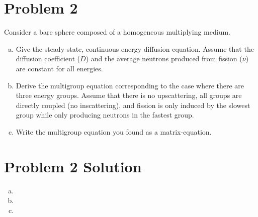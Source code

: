 \documentclass{report}
\begin{document}
\section*{Problem 2}

Consider a bare sphere composed of a homogeneous multiplying medium.
\begin{enumerate}[a)]
\item Give the steady-state, continuous energy diffusion equation. Assume that the diffusion coefficient ($D$) and the average neutrons produced from fission ($\nu$) are constant for all energies.
\item Derive the multigroup equation corresponding to the case where there are three energy groups. Assume that there is no upscattering, all groups are directly coupled (no inscattering), and fission is only induced by the slowest group while only producing neutrons in the fastest group.
\item Write the multigroup equation you found as a matrix-equation.
\end{enumerate}



\section*{Problem 2 Solution}

\begin{enumerate}[a)]

\item 
\item
\item

\end{enumerate}
\end{document}
